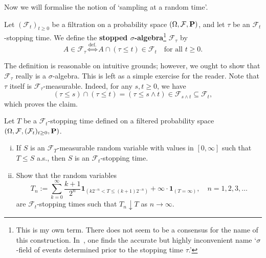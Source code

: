 Now we will formalise the notion of `sampling at a random time'.
\begin{definition}
Let $(\mathcal{F}_t)_{t \ge 0}$ be a filtration on a probability space $(\Omega,\mathcal{F},\mathbf{P})$, and let $\tau$ be an $\mathcal{F}_t$-stopping time. We define the \textbf{stopped $\sigma$-algebra}\footnote{ This is my own term. There does not seem to be a consensus for the name of this construction. In~\cite{KS}, one finds the accurate but highly inconvenient name `$\sigma$-field of events determined prior to the stopping time $\tau$.'} $\mathcal{F}_{\tau}$ by
\begin{equation*}
    A \in \mathcal{F}_\tau \overset{\text{def.}}{\iff} A \cap (\tau \le t) \in\mathcal{F}_t \quad \text{for all } t\ge 0.
\end{equation*}
\end{definition}

The definition is reasonable on intuitive grounds; however, we ought to show that $\mathcal{F}_\tau$ really is a $\sigma$-algebra. This is left as a simple exercise for the reader. Note that $\tau$ itself is $\mathcal{F}_\tau$-measurable. Indeed, for any $s,t\ge 0$, we have
\begin{equation*}
    (\tau\le s)\cap (\tau\le t) = (\tau\le s\wedge t)\in\mathcal{F}_{s\wedge t}\subseteq\mathcal{F}_t,
\end{equation*}
which proves the claim.

\begin{exercise}
\label{exer:stop-approx}
    Let $T$ be a $\mathcal{F}_t$-stopping time defined on a filtered probability space $(\Omega,\mathcal{F},(\mathcal{F}_t)_{t\ge 0},\mathbf{P})$. 
    \begin{enumerate}[(i)]
        \item If $S$ is an $\mathcal{F}_T$-measurable random variable with values in $[0,\infty]$ such that $T\le S$ a.s., then $S$ is an $\mathcal{F}_t$-stopping time.

        \item Show that the random variables
        \begin{equation*}
            T_n := \sum_{k=0}^\infty \frac{k+1}{2^n}\mathbf{1}_{(k2^{-n}<T\le (k+1)2^{-n})} + \infty\cdot\mathbf{1}_{(T=\infty)}, \quad n=1,2,3,\ldots
        \end{equation*}
        are $\mathcal{F}_t$-stopping times such that $T_n\downarrow T$ as $n\to\infty$.
    \end{enumerate}
\end{exercise}

